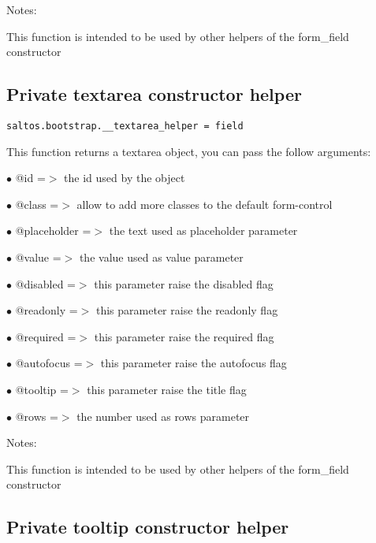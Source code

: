 \documentclass[a4paper]{book}
\begin{document}
Notes:

This function is intended to be used by other helpers of the form\_field constructor

\hypertarget{toc467}{}
\subsection{Private textarea constructor helper}

\begin{lstlisting}
saltos.bootstrap.__textarea_helper = field
\end{lstlisting}

This function returns a textarea object, you can pass the follow arguments:

\begin{compactitem}
\item[\color{myblue}$\bullet$] @id          =$>$ the id used by the object
\item[\color{myblue}$\bullet$] @class       =$>$ allow to add more classes to the default form-control
\item[\color{myblue}$\bullet$] @placeholder =$>$ the text used as placeholder parameter
\item[\color{myblue}$\bullet$] @value       =$>$ the value used as value parameter
\item[\color{myblue}$\bullet$] @disabled    =$>$ this parameter raise the disabled flag
\item[\color{myblue}$\bullet$] @readonly    =$>$ this parameter raise the readonly flag
\item[\color{myblue}$\bullet$] @required    =$>$ this parameter raise the required flag
\item[\color{myblue}$\bullet$] @autofocus   =$>$ this parameter raise the autofocus flag
\item[\color{myblue}$\bullet$] @tooltip     =$>$ this parameter raise the title flag
\item[\color{myblue}$\bullet$] @rows        =$>$ the number used as rows parameter
\end{compactitem}

Notes:

This function is intended to be used by other helpers of the form\_field constructor

\hypertarget{toc468}{}
\subsection{Private tooltip constructor helper}
\end{document}
